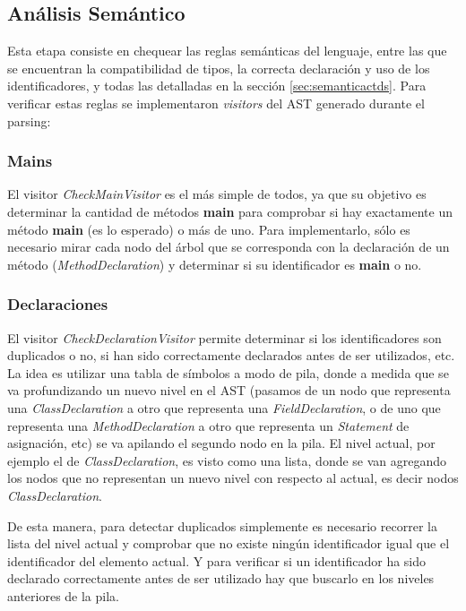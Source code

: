 \documentclass[11pt,a4paper]{article}
\begin{document}
\subsection{Análisis Semántico} 
\label{subsec:semantico}

Esta etapa consiste en chequear las reglas semánticas del lenguaje, entre las que se encuentran la compatibilidad de tipos, la correcta declaración y uso de los identificadores, y todas las detalladas en la sección \ref{sec:semanticactds}. Para verificar estas reglas se implementaron \textit{visitors} del AST generado durante el parsing: 

\subsubsection{Mains}
\label{mains}
El visitor \textit{CheckMainVisitor} es el más simple de todos, ya que su objetivo es determinar la cantidad de métodos \textbf{main} para comprobar si hay exactamente un método \textbf{main} (es lo esperado) o más de uno. Para implementarlo, sólo es necesario mirar cada nodo del árbol que se corresponda con la declaración de un método (\textit{MethodDeclaration}) y determinar si su identificador es \textbf{main} o no.
 
\subsubsection{Declaraciones}
\label{subsec:decls}

El visitor \textit{CheckDeclarationVisitor} permite determinar si los identificadores son duplicados o no, si han sido correctamente declarados antes de ser utilizados, etc. La idea es utilizar una tabla de símbolos a modo de pila, donde a medida que se va profundizando un nuevo nivel en el AST (pasamos de  un nodo que representa una \textit{ClassDeclaration} a otro que representa una \textit{FieldDeclaration}, o de uno que representa una \textit{MethodDeclaration} a otro que representa un \textit{Statement} de asignación, etc) se va apilando el segundo nodo en la pila. El nivel actual, por ejemplo el de \textit{ClassDeclaration}, es visto como una lista, donde se van agregando los nodos que no representan un nuevo nivel con respecto al actual, es decir nodos \textit{ClassDeclaration}. 

De esta manera, para detectar duplicados simplemente es necesario recorrer la lista del nivel actual y comprobar que no existe ningún identificador igual que el identificador del elemento actual. Y para verificar si un identificador ha sido declarado correctamente antes de ser utilizado hay que buscarlo en los niveles anteriores de la pila. 
\end{document}
